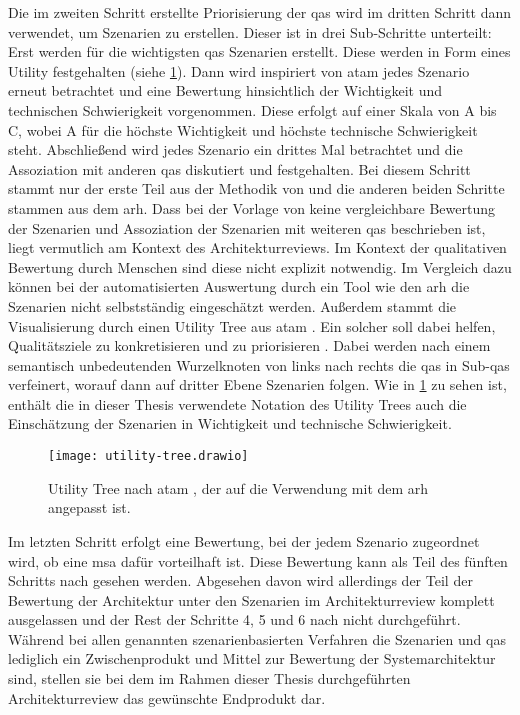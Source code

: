 Die im zweiten Schritt erstellte Priorisierung der \glspl{qa} wird im dritten Schritt dann verwendet, um Szenarien zu erstellen.
Dieser ist in drei Sub-Schritte unterteilt:
Erst werden für die wichtigsten \glspl{qa} Szenarien erstellt.
Diese werden in Form eines Utility festgehalten (siehe \cref{fig:utility-tree}).
Dann wird inspiriert von \gls{atam} \cite{kazman_2000} jedes Szenario erneut betrachtet und eine Bewertung hinsichtlich der Wichtigkeit und technischen Schwierigkeit vorgenommen.
Diese erfolgt auf einer Skala von A bis C, wobei A für die höchste Wichtigkeit und höchste technische Schwierigkeit steht.
Abschließend wird jedes Szenario ein drittes Mal betrachtet und die Assoziation mit anderen \glspl{qa} diskutiert und festgehalten.
Bei diesem Schritt stammt nur der erste Teil aus der Methodik von  und die anderen beiden Schritte stammen aus dem \gls{arh}.
Dass bei der Vorlage von  keine vergleichbare Bewertung der Szenarien und Assoziation der Szenarien mit weiteren \glspl{qa} beschrieben ist, liegt vermutlich am Kontext des Architekturreviews.
Im Kontext der qualitativen Bewertung durch Menschen sind diese nicht explizit notwendig.
Im Vergleich dazu können bei der automatisierten Auswertung durch ein Tool wie den \gls{arh} die Szenarien nicht selbstständig eingeschätzt werden.
Außerdem stammt die Visualisierung durch einen Utility Tree aus \gls{atam} \cite{kazman_2000}.
Ein solcher soll dabei helfen, Qualitätsziele zu konkretisieren und zu priorisieren \cite{kazman_2000}.
Dabei werden nach einem semantisch unbedeutenden Wurzelknoten von links nach rechts die \glspl{qa} in Sub-\glspl{qa} verfeinert, worauf dann auf dritter Ebene Szenarien folgen.
Wie in \cref{fig:utility-tree} zu sehen ist, enthält die in dieser Thesis verwendete Notation des Utility Trees auch die Einschätzung der Szenarien in Wichtigkeit und technische Schwierigkeit.
\begin{figure}[!h]
	\centering
	\texttt{[image: utility-tree.drawio]}
	\caption[Utility Tree nach \acrshort{atam}]{
		Utility Tree nach \gls{atam} \cite{kazman_2000}, der auf die Verwendung mit dem \gls{arh} angepasst ist.
	}
	\label{fig:utility-tree}
\end{figure}


Im letzten Schritt erfolgt eine Bewertung, bei der jedem Szenario zugeordnet wird, ob eine \gls{msa} dafür vorteilhaft ist.
Diese Bewertung kann als Teil des fünften Schritts nach  gesehen werden.
Abgesehen davon wird allerdings der Teil der Bewertung der Architektur unter den Szenarien im Architekturreview komplett ausgelassen und der Rest der Schritte 4, 5 und 6 nach  nicht durchgeführt.
Während bei allen genannten szenarienbasierten Verfahren die Szenarien und \glspl{qa} lediglich ein Zwischenprodukt und Mittel zur Bewertung der Systemarchitektur sind, stellen sie bei dem im Rahmen dieser Thesis durchgeführten Architekturreview das gewünschte Endprodukt dar.

